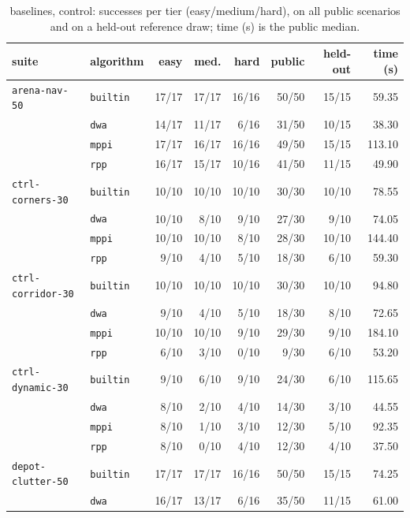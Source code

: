\begin{table}[t]
\centering
\scriptsize
\caption{ baselines, control: successes per tier (easy/medium/hard), on all public scenarios and on a held-out reference draw; time (s) is the public median.}
\label{tab:base-control}
\setlength{\tabcolsep}{2.5pt}
\begin{tabular}{llrrrrrr}
\toprule
suite & algorithm & easy & med. & hard & public & held-out & time (s) \\
\midrule
\texttt{arena-nav-50} & \texttt{builtin} & 17/17 & 17/17 & 16/16 & 50/50 & 15/15 & 59.35 \\
 & \texttt{dwa} & 14/17 & 11/17 & 6/16 & 31/50 & 10/15 & 38.30 \\
 & \texttt{mppi} & 17/17 & 16/17 & 16/16 & 49/50 & 15/15 & 113.10 \\
 & \texttt{rpp} & 16/17 & 15/17 & 10/16 & 41/50 & 11/15 & 49.90 \\
\midrule
\texttt{ctrl-corners-30} & \texttt{builtin} & 10/10 & 10/10 & 10/10 & 30/30 & 10/10 & 78.55 \\
 & \texttt{dwa} & 10/10 & 8/10 & 9/10 & 27/30 & 9/10 & 74.05 \\
 & \texttt{mppi} & 10/10 & 10/10 & 8/10 & 28/30 & 10/10 & 144.40 \\
 & \texttt{rpp} & 9/10 & 4/10 & 5/10 & 18/30 & 6/10 & 59.30 \\
\midrule
\texttt{ctrl-corridor-30} & \texttt{builtin} & 10/10 & 10/10 & 10/10 & 30/30 & 10/10 & 94.80 \\
 & \texttt{dwa} & 9/10 & 4/10 & 5/10 & 18/30 & 8/10 & 72.65 \\
 & \texttt{mppi} & 10/10 & 10/10 & 9/10 & 29/30 & 9/10 & 184.10 \\
 & \texttt{rpp} & 6/10 & 3/10 & 0/10 & 9/30 & 6/10 & 53.20 \\
\midrule
\texttt{ctrl-dynamic-30} & \texttt{builtin} & 9/10 & 6/10 & 9/10 & 24/30 & 6/10 & 115.65 \\
 & \texttt{dwa} & 8/10 & 2/10 & 4/10 & 14/30 & 3/10 & 44.55 \\
 & \texttt{mppi} & 8/10 & 1/10 & 3/10 & 12/30 & 5/10 & 92.35 \\
 & \texttt{rpp} & 8/10 & 0/10 & 4/10 & 12/30 & 4/10 & 37.50 \\
\midrule
\texttt{depot-clutter-50} & \texttt{builtin} & 17/17 & 17/17 & 16/16 & 50/50 & 15/15 & 74.25 \\
 & \texttt{dwa} & 16/17 & 13/17 & 6/16 & 35/50 & 11/15 & 61.00 \\

\end{tabular}
\end{table}

